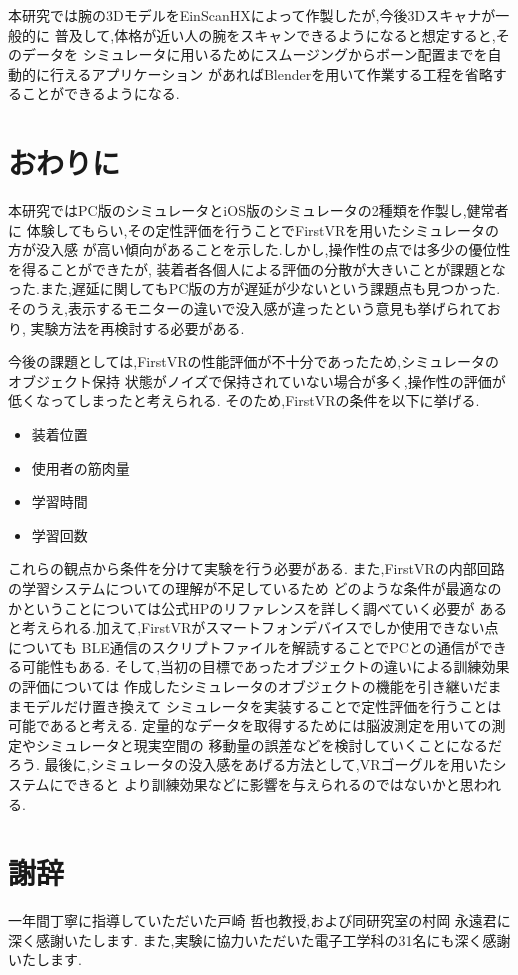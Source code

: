 \documentclass{ltjsreport}
\begin{document}
	本研究では腕の3DモデルをEinScanHXによって作製したが,今後3Dスキャナが一般的に
	普及して,体格が近い人の腕をスキャンできるようになると想定すると,そのデータを
	シミュレータに用いるためにスムージングからボーン配置までを自動的に行えるアプリケーション
	があればBlenderを用いて作業する工程を省略することができるようになる.

\chapter{おわりに}
	本研究ではPC版のシミュレータとiOS版のシミュレータの2種類を作製し,健常者に
	体験してもらい,その定性評価を行うことでFirstVRを用いたシミュレータの方が没入感
	が高い傾向があることを示した.しかし,操作性の点では多少の優位性を得ることができたが,
	装着者各個人による評価の分散が大きいことが課題となった.また,遅延に関してもPC版の方が遅延が少ないという課題点も見つかった.
	そのうえ,表示するモニターの違いで没入感が違ったという意見も挙げられており,
	実験方法を再検討する必要がある.

	今後の課題としては,FirstVRの性能評価が不十分であったため,シミュレータのオブジェクト保持
	状態がノイズで保持されていない場合が多く,操作性の評価が低くなってしまったと考えられる.
	そのため,FirstVRの条件を以下に挙げる.
	\begin{itemize}
		\item 装着位置
		\item 使用者の筋肉量
		\item 学習時間
		\item 学習回数
	\end{itemize}
	これらの観点から条件を分けて実験を行う必要がある.
	また,FirstVRの内部回路の学習システムについての理解が不足しているため
	どのような条件が最適なのかということについては公式HPのリファレンスを詳しく調べていく必要が
	あると考えられる.加えて,FirstVRがスマートフォンデバイスでしか使用できない点についても
	BLE通信のスクリプトファイルを解読することでPCとの通信ができる可能性もある.
	そして,当初の目標であったオブジェクトの違いによる訓練効果の評価については
	作成したシミュレータのオブジェクトの機能を引き継いだままモデルだけ置き換えて
	シミュレータを実装することで定性評価を行うことは可能であると考える.
	定量的なデータを取得するためには脳波測定を用いての測定やシミュレータと現実空間の
	移動量の誤差などを検討していくことになるだろう.
	最後に,シミュレータの没入感をあげる方法として,VRゴーグルを用いたシステムにできると
	より訓練効果などに影響を与えられるのではないかと思われる.
\clearpage

\chapter*{謝辞}
一年間丁寧に指導していただいた戸崎 哲也教授,および同研究室の村岡 永遠君に深く感謝いたします.
また,実験に協力いただいた電子工学科の31名にも深く感謝いたします.
\end{document}
